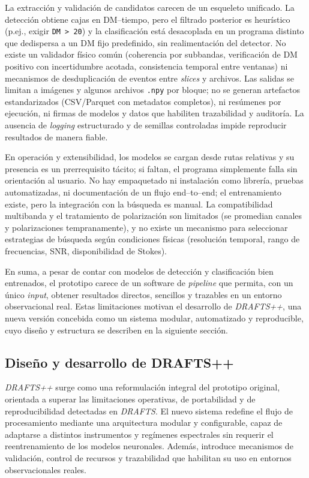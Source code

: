 La extracción y validación de candidatos carecen de un esqueleto unificado. La detección obtiene cajas en DM–tiempo, pero el filtrado posterior es heurístico (p.ej., exigir \texttt{DM > 20}) y la clasificación está desacoplada en un programa distinto que dedispersa a un DM fijo predefinido, sin realimentación del detector. No existe un validador físico común (coherencia por subbandas, verificación de DM positivo con incertidumbre acotada, consistencia temporal entre ventanas) ni mecanismos de desduplicación de eventos entre \textit{slices} y archivos. Las salidas se limitan a imágenes y algunos archivos \texttt{.npy} por bloque; no se generan artefactos estandarizados (CSV/Parquet con metadatos completos), ni resúmenes por ejecución, ni firmas de modelos y datos que habiliten trazabilidad y auditoría. La ausencia de \textit{logging} estructurado y de semillas controladas impide reproducir resultados de manera fiable.

En operación y extensibilidad, los modelos se cargan desde rutas relativas y su presencia es un prerrequisito tácito; si faltan, el programa simplemente falla sin orientación al usuario. No hay empaquetado ni instalación como librería, pruebas automatizadas, ni documentación de un flujo end–to–end; el entrenamiento existe, pero la integración con la búsqueda es manual. La compatibilidad multibanda y el tratamiento de polarización son limitados (se promedian canales y polarizaciones tempranamente), y no existe un mecanismo para seleccionar estrategias de búsqueda según condiciones físicas (resolución temporal, rango de frecuencias, SNR, disponibilidad de Stokes).

En suma, a pesar de contar con modelos de detección y clasificación bien entrenados, el prototipo carece de un software de \textit{pipeline} que permita, con un único \textit{input}, obtener resultados directos, sencillos y trazables en un entorno observacional real.
Estas limitaciones motivan el desarrollo de \textit{DRAFTS++}, una nueva versión concebida como un sistema modular, automatizado y reproducible, cuyo diseño y estructura se describen en la siguiente sección.


\subsection{Diseño y desarrollo de DRAFTS++}

\textit{DRAFTS++} surge como una reformulación integral del prototipo original, orientada a superar las limitaciones operativas, de portabilidad y de reproducibilidad detectadas en \textit{DRAFTS}. El nuevo sistema redefine el flujo de procesamiento mediante una arquitectura modular y configurable, capaz de adaptarse a distintos instrumentos y regímenes espectrales sin requerir el reentrenamiento de los modelos neuronales. Además, introduce mecanismos de validación, control de recursos y trazabilidad que habilitan su uso en entornos observacionales reales.

